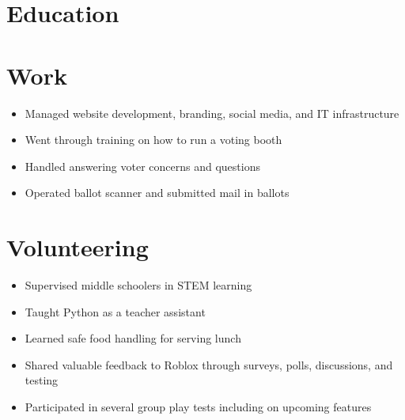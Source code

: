 \documentclass{my_cv} %
\begin{document}

\section{Education}

\section{Work}
\begin{itemize}
    \item Managed website development, branding, social media, and IT infrastructure
\end{itemize}

\begin{itemize}
    \item Went through training on how to run a voting booth
    \item Handled answering voter concerns and questions
    \item Operated ballot scanner and submitted mail in ballots
\end{itemize}

\section{Volunteering}
\begin{itemize}
    \item Supervised middle schoolers in STEM learning
    \item Taught Python as a teacher assistant
    \item Learned safe food handling for serving lunch
\end{itemize}

\begin{itemize}
    \item Shared valuable feedback to Roblox through surveys, polls, discussions, and testing
    \item Participated in several group play tests including on upcoming features
\end{itemize}
\end{document}
